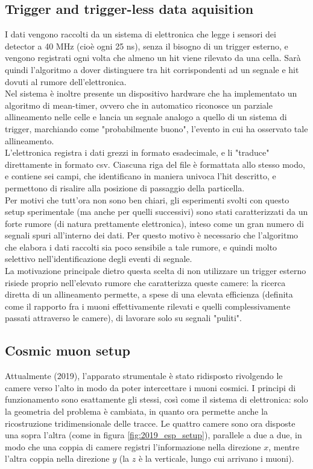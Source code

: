 \documentclass[a4paper,11pt]{book}
\begin{document}
\subsection{Trigger and trigger-less data aquisition}

I dati vengono raccolti da un sistema di elettronica che legge i sensori dei detector a 40 MHz (cioè ogni 25 ns), senza il bisogno di un trigger esterno, e vengono registrati ogni volta che almeno un hit viene rilevato da una cella. Sarà quindi l'algoritmo a dover distinguere tra hit corrispondenti ad un segnale e hit dovuti al rumore dell'elettronica.\\
Nel sistema è inoltre presente un dispositivo hardware che ha implementato un algoritmo di mean-timer, ovvero che in automatico riconosce un parziale allineamento nelle celle e lancia un segnale analogo a quello di un sistema di trigger, marchiando come "probabilmente buono", l'evento in cui ha osservato tale allineamento.\\
L'elettronica registra i dati grezzi in formato esadecimale, e li "traduce" direttamente in formato csv. Ciascuna riga del file è formattata allo stesso modo, e contiene sei campi, che identificano in maniera univoca l'hit descritto, e permettono di risalire alla posizione di passaggio della particella.\\

Per motivi che tutt'ora non sono ben chiari, gli esperimenti svolti con questo setup sperimentale (ma anche per quelli successivi) sono stati caratterizzati da un forte rumore (di natura prettamente elettronica), inteso come un gran numero di segnali spuri all'interno dei dati. Per questo motivo è necessario che l'algoritmo che elabora i dati raccolti sia poco sensibile a tale rumore, e quindi molto selettivo nell'identificazione degli eventi di segnale.\\
La motivazione principale dietro questa scelta di non utilizzare un trigger esterno risiede proprio nell'elevato rumore che caratterizza queste camere: la ricerca diretta di un allineamento permette, a spese di una elevata efficienza (definita come il rapporto fra i muoni effettivamente rilevati e quelli complessivamente passati attraverso le camere), di lavorare solo su segnali "puliti".\\


\subsection{Cosmic muon setup}
Attualmente (2019), l'apparato strumentale è stato ridisposto rivolgendo le camere verso l'alto in modo da poter intercettare i muoni cosmici. I principi di funzionamento sono esattamente gli stessi, così come il sistema di elettronica: solo la geometria del problema è cambiata, in quanto ora permette anche la ricostruzione tridimensionale delle tracce. Le quattro camere sono ora disposte una sopra l'altra (come in figura \ref{fig:2019_esp_setup}), parallele a due a due, in modo che una coppia di camere registri l'informazione nella direzione $x$, mentre l'altra coppia nella direzione $y$ (la $z$ è la verticale, lungo cui arrivano i muoni).\\
\end{document}
